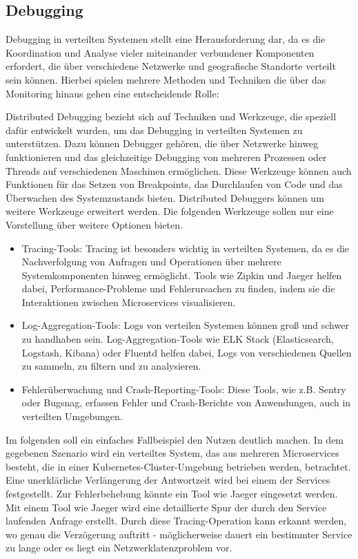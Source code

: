 \subsection{Debugging}


Debugging in verteilten Systemen stellt eine Herausforderung dar, da es die Koordination und Analyse vieler miteinander verbundener Komponenten erfordert, die über verschiedene Netzwerke und geografische Standorte verteilt sein können. Hierbei spielen mehrere Methoden und Techniken die über das Monitoring hinaus gehen eine entscheidende Rolle:


Distributed Debugging bezieht sich auf Techniken und Werkzeuge, die speziell dafür entwickelt wurden, um das Debugging in verteilten Systemen zu unterstützen. Dazu können Debugger gehören, die über Netzwerke hinweg funktionieren und das gleichzeitige Debugging von mehreren Prozessen oder Threads auf verschiedenen Maschinen ermöglichen. Diese Werkzeuge können auch Funktionen für das Setzen von Breakpoints, das Durchlaufen von Code und das Überwachen des Systemzustands bieten. Distributed Debuggers können um weitere Werkzeuge erweitert werden. Die folgenden Werkzeuge sollen nur eine Vorstellung über weitere Optionen bieten.
\begin{itemize}
\item Tracing-Tools: Tracing ist besonders wichtig in verteilten Systemen, da es die Nachverfolgung von Anfragen und Operationen über mehrere Systemkomponenten hinweg ermöglicht. Tools wie Zipkin und Jaeger helfen dabei, Performance-Probleme und Fehlerursachen zu finden, indem sie die Interaktionen zwischen Microservices visualisieren.
\item Log-Aggregation-Tools: Logs von verteilen Systemen können groß und schwer zu handhaben sein. Log-Aggregation-Tools wie ELK Stack (Elasticsearch, Logstash, Kibana) oder Fluentd helfen dabei, Logs von verschiedenen Quellen zu sammeln, zu filtern und zu analysieren.
\item Fehlerüberwachung und Crash-Reporting-Tools: Diese Tools, wie z.B. Sentry oder Bugsnag, erfassen Fehler und Crash-Berichte von Anwendungen, auch in verteilten Umgebungen.
\end{itemize}

Im folgenden soll ein einfaches Fallbeispiel den Nutzen deutlich machen. In dem gegebenen Szenario wird ein verteiltes System, das aus mehreren Microservices besteht, die in einer Kubernetes-Cluster-Umgebung betrieben werden, betrachtet. Eine unerklärliche Verlängerung der Antwortzeit wird bei einem der Services festgestellt. Zur Fehlerbehebung könnte ein Tool wie Jaeger eingesetzt werden. Mit einem Tool wie Jaeger wird eine detaillierte Spur der durch den Service laufenden Anfrage erstellt. Durch diese Tracing-Operation kann erkannt werden, wo genau die Verzögerung auftritt - möglicherweise dauert ein bestimmter Service zu lange oder es liegt ein Netzwerklatenzproblem vor.

